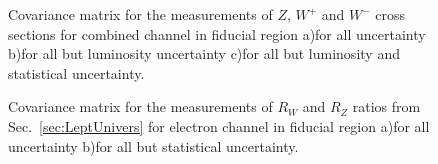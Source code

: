\begin{figure}[!h]
\begin{minipage}[h]{0.32\linewidth}
\end{minipage}
\hfill
\begin{minipage}[h]{0.32\linewidth}
\end{minipage}
\hfill
\begin{minipage}[h]{0.32\linewidth}
\end{minipage}
\caption{Covariance matrix for the measurements of $Z$, $W^+$ and $W^{-}$  cross sections for combined channel in fiducial region a)for all uncertainty b)for all but luminosity uncertainty c)for all but luminosity and statistical uncertainty. }
\end{figure}

\begin{figure}[!h]
\begin{minipage}[h]{0.49\linewidth}
\end{minipage}
\hfill
\begin{minipage}[h]{0.49\linewidth}
\end{minipage}
\caption{Covariance matrix for the measurements of $R_{W}$ and $R_{Z}$  ratios from Sec.~\ref{sec:LeptUnivers} for electron channel in fiducial region a)for all uncertainty b)for all but statistical uncertainty. }
\end{figure}